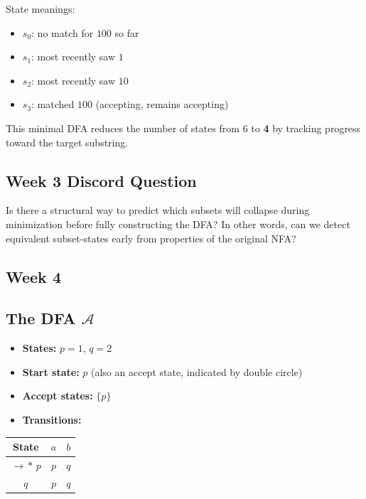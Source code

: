 \documentclass{article}
\theoremstyle{theorem}
\theoremstyle{definition}
\theoremstyle{remark}
\begin{document}
\noindent State meanings:
\begin{itemize}
\item $s_0$: no match for $100$ so far
\item $s_1$: most recently saw $1$
\item $s_2$: most recently saw $10$
\item $s_3$: matched $100$ (accepting, remains accepting)
\end{itemize}

This minimal DFA reduces the number of states from 6 to \textbf{4} by tracking progress toward the target substring.

\subsection*{Week 3 Discord Question}
Is there a structural way to predict which subsets will collapse during minimization before fully constructing the DFA? In other words, can we detect equivalent subset-states early from properties of the original NFA?

\subsection{Week 4}

\subsection*{The DFA $\mathcal{A}$}

\begin{itemize}
    \item \textbf{States:} $p = 1$, $q = 2$
    \item \textbf{Start state:} $p$ (also an accept state, indicated by double circle)
    \item \textbf{Accept states:} $\{p\}$
    \item \textbf{Transitions:}
\end{itemize}

\begin{center}
\begin{tabular}{c||c|c}
\toprule
\textbf{State} & $a$ & $b$ \\
\midrule
$\rightarrow\!*\, p$ & $p$ & $q$ \\
$q$                  & $p$ & $q$ \\
\bottomrule
\end{tabular}
\end{center}
\end{document}

